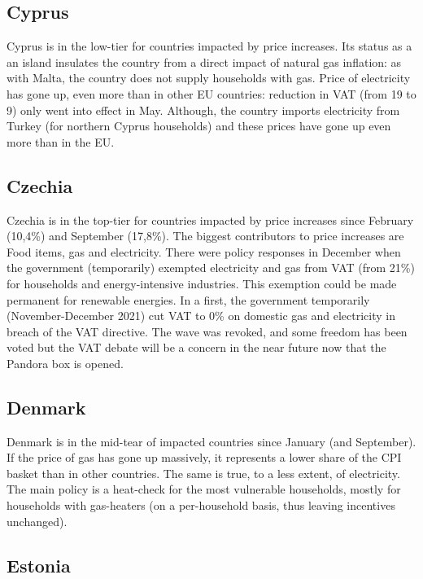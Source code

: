 \documentclass[
  9pt,
  a4paper,
  numbers=noendperiod,
  DIV=12]{scrartcl}
\begin{document}
\hypertarget{cyprus}{%
\subsection{Cyprus}\label{cyprus}}

Cyprus is in the low-tier for countries impacted by price increases. Its
status as a an island insulates the country from a direct impact of
natural gas inflation: as with Malta, the country does not supply
households with gas. Price of electricity has gone up, even more than in
other EU countries: reduction in VAT (from 19 to 9) only went into
effect in May. Although, the country imports electricity from Turkey
(for northern Cyprus households) and these prices have gone up even more
than in the EU.

\hypertarget{czechia}{%
\subsection{Czechia}\label{czechia}}

Czechia is in the top-tier for countries impacted by price increases
since February (10,4\%) and September (17,8\%). The biggest contributors
to price increases are Food items, gas and electricity. There were
policy responses in December when the government (temporarily) exempted
electricity and gas from VAT (from 21\%) for households and
energy-intensive industries. This exemption could be made permanent for
renewable energies. In a first, the government temporarily
(November-December 2021) cut VAT to 0\% on domestic gas and electricity
in breach of the VAT directive. The wave was revoked, and some freedom
has been voted but the VAT debate will be a concern in the near future
now that the Pandora box is opened.

\hypertarget{denmark}{%
\subsection{Denmark}\label{denmark}}

Denmark is in the mid-tear of impacted countries since January (and
September). If the price of gas has gone up massively, it represents a
lower share of the CPI basket than in other countries. The same is true,
to a less extent, of electricity. The main policy is a heat-check for
the most vulnerable households, mostly for households with gas-heaters
(on a per-household basis, thus leaving incentives unchanged).

\hypertarget{estonia}{%
\subsection{Estonia}\label{estonia}}
\end{document}
